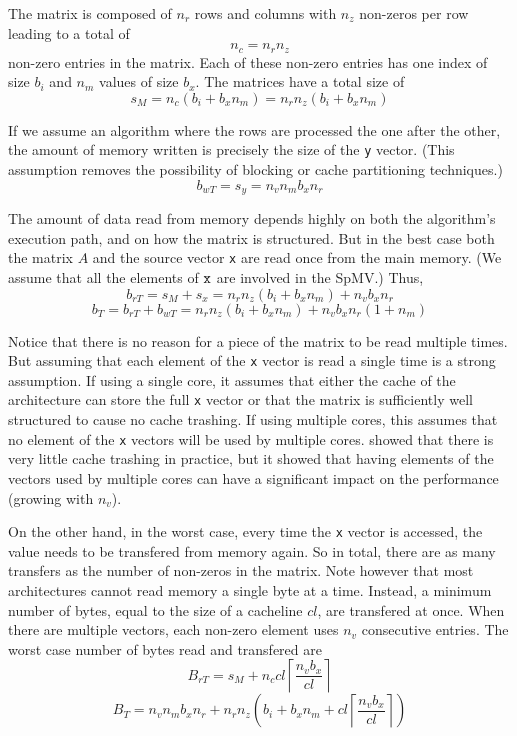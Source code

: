 \documentclass[10pt,conference,compsocconf]{IEEEtran}
\newcommand{\ceil}[1]{\left\lceil#1\right\rceil}
\begin{document}
The matrix is composed of $n_r$ rows and columns with $n_z$ non-zeros
per row leading to a total of $$n_c = n_r n_z$$ non-zero entries in
the matrix. Each of these non-zero entries has one index of size $b_i$
and $n_m$ values of size $b_x$. The matrices have a total size
of $$s_M = n_c (b_i + b_x n_m) = n_r n_z (b_i + b_x n_m)$$

If we assume an algorithm where the rows are processed the one after
the other, the amount of memory written is precisely the
size of the {\tt y} vector. (This assumption removes the possibility of
blocking or cache partitioning techniques.) $$b_{wT} = s_y = n_v n_m b_x n_r$$

The amount of data read from memory depends highly on both the
algorithm's execution path, and on how the matrix is structured. But
in the best case both the matrix $A$ and the source vector {\tt x} are
read once from the main memory. (We assume that all the elements of
$\tt x$ are involved in the SpMV.)  Thus, $$b_{rT} = s_M + s_x = n_r
n_z (b_i + b_x n_m) + n_v b_x n_r$$
 $$b_T = b_{rT} + b_{wT} =  n_r n_z (b_i + b_x n_m) + n_v b_x n_r (1 + n_m)$$

Notice that there is no reason for a piece of the matrix to be read
multiple times. But assuming that each element of the {\tt x} vector
is read a single time is a strong assumption. If using a single core,
it assumes that either the cache of the architecture can store the full
{\tt x} vector or that the matrix is sufficiently well structured 
to cause no cache trashing. If using multiple cores, this assumes that
no element of the {\tt x} vectors will be used by multiple
cores. \cite{Saule13-ARXIV} showed that there is very little cache trashing
in practice, but it showed that having elements of the vectors used by
multiple cores can have a significant impact on the performance
(growing with $n_v$).

On the other hand, in the worst case, every time the {\tt x} vector is
accessed, the value needs to be transfered from memory again. So in
total, there are as many transfers as the number of non-zeros in the
matrix. Note however that most architectures cannot read memory a
single byte at a time. Instead, a minimum number of bytes, equal to
the size of a cacheline $cl$, are transfered at once.  When there are
multiple vectors, each non-zero element uses $n_v$ consecutive
entries. The worst case number of bytes read and transfered are
$$B_{rT} = s_M + n_c cl \ceil{\frac{n_vb_x}{cl}} $$ 
$$B_T = n_v n_m b_x n_r + n_r n_z \left ( b_i + b_x n_m +  cl \ceil{\frac{n_vb_x}{cl}} \right)$$
\end{document}
